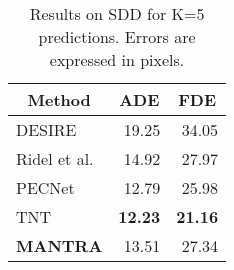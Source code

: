 \documentclass[10pt,twocolumn,letterpaper]{article}
\begin{document}
\begin{table}[]
	\centering
	\begin{tabular}{l|r|r}
\multicolumn{1}{c|}{\textbf{Method}} & \multicolumn{1}{c|}{\textbf{ADE}} & \multicolumn{1}{c}{\textbf{FDE}} \\ \hline
DESIRE \cite{lee2017desire}       & 19.25                             & 34.05                             \\
		Ridel et al. \cite{ridel2020scene}& 14.92                             & 27.97                             \\
		PECNet \cite{mangalam2020not}     & 12.79                             & 25.98                             \\
		TNT \cite{Zhao2020TNTTT}          & \textbf{12.23}                             & \textbf{21.16}                             \\ \hline
		\textbf{MANTRA}	& 13.51                             & 27.34                             \\
	\end{tabular}
	\caption{
		\label{tab:sdd}Results on SDD for K=5 predictions. Errors are expressed in pixels.}
\end{table}
\end{document}

